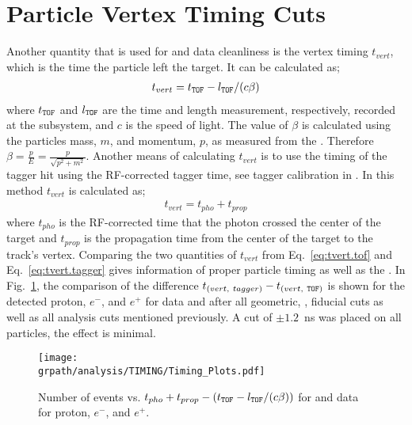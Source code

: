 \section{Particle Vertex Timing Cuts}\label{sec:analysis.timing}
Another quantity that is used for  and data cleanliness is the vertex timing $t_{vert}$, which is the time the particle left the target. It can be calculated as;
\begin{align}
t_{vert}= t_{\textsc{\texttt{TOF}}} -  l_{\textsc{\texttt{TOF}}}/(c\beta) \label{eq:tvert.tof}
\end{align}
where $t_{\textsc{\texttt{TOF}}}$ and $l_{\textsc{\texttt{TOF}}}$ are the time and length measurement, respectively, recorded at the  subsystem, and $c$ is the speed of light. The value of $\beta$ is calculated using the particles mass, $m$, and momentum, $p$, as measured from the . Therefore $\beta = \frac{p}{E} = \frac{p}{\sqrt{p^2+m^2}}$. Another means of calculating $t_{vert}$ is to use the timing of the tagger hit using the RF-corrected tagger time, see tagger calibration in \cite{clas.g12.note}. In this method $t_{vert}$ is calculated as;
\begin{align}
t_{vert}=t_{pho} + t_{prop} \label{eq:tvert.tagger}
\end{align}
where $t_{pho}$ is the RF-corrected time that the photon crossed the center of the target and $t_{prop}$ is the propagation time from the center of the target to the track's vertex. Comparing the two quantities of $t_{vert}$ from Eq.~\ref{eq:tvert.tof} and Eq.~\ref{eq:tvert.tagger} gives information of proper particle timing as well as the . In Fig.~\ref{fig:timing.all}, the comparison of the difference $t_{(vert, \ tagger)} - t_{(vert,\ \abbr{TOF})}$ is shown for the detected proton, $e^-$, and $e^+$ for data and  after all geometric, ,  fiducial cuts as well as all analysis cuts mentioned previously. A cut of $\pm 1.2$~ns was placed on all particles, the effect is minimal.


\begin{figure}[h!]\begin{center}
\texttt{[image: \\grpath/analysis/TIMING/Timing\_Plots.pdf]}
\caption[Number of events vs. $t_{pho} + t_{prop} - (t_{\abbr{TOF}} -  l_{\abbr{TOF}}/(c\beta))$ for  and data for proton, $e^-$, and $e^+$]{\label{fig:timing.all}Number of events vs. $t_{pho} + t_{prop} - (t_{\abbr{TOF}} -  l_{\abbr{TOF}}/(c\beta))$ for  and data for proton, $e^-$, and $e^+$.}
\end{center}\end{figure}

